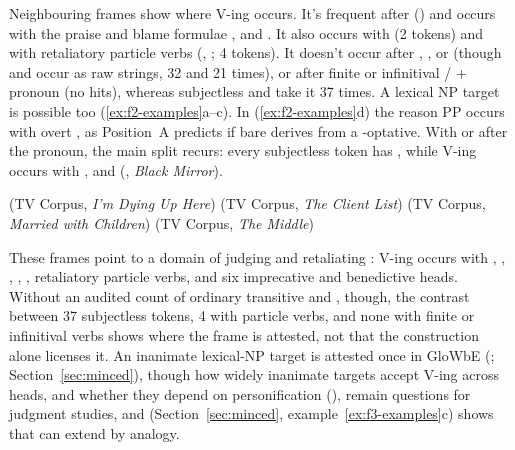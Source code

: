 \documentclass[12pt]{article}
\begin{document}
Neighbouring frames show where  V-ing occurs. It's frequent after  () and occurs with the praise and blame formulae ,  and . It also occurs with  (2 tokens) and with retaliatory particle verbs (, ; 4 tokens). It doesn't occur after , ,  or  (though  and  occur as raw strings, 32 and 21 times), or after finite or infinitival / + pronoun (no hits), whereas subjectless  and  take it 37 times. A lexical NP target is possible too (\ref{ex:f2-examples}a--c). In (\ref{ex:f2-examples}d) the reason PP occurs with overt , as Position~A predicts if bare  derives from a -optative. With  or  after the pronoun, the main split recurs: every subjectless  token has , while  V-ing occurs with ,  and  (, \emph{Black Mirror}).

\ea\label{ex:f2-examples}
\ea {} \hfill (TV Corpus, \emph{I'm Dying Up Here})
\ex {} \hfill (TV Corpus, \emph{The Client List})
\ex {} \hfill (TV Corpus, \emph{Married with Children})
\ex {} \hfill (TV Corpus, \emph{The Middle})
\z
\z

These frames point to a domain of judging and retaliating \citep{fillmore1971}:  V-ing occurs with , , , , , retaliatory particle verbs, and six imprecative and benedictive heads. Without an audited count of ordinary transitive  and , though, the contrast between 37 subjectless tokens, 4 with particle verbs, and none with finite or infinitival verbs shows where the frame is attested, not that the construction alone licenses it. An inanimate lexical-NP target is attested once in GloWbE (; Section~\ref{sec:minced}), though how widely inanimate targets accept  V-ing across heads, and whether they depend on personification (), remain questions for judgment studies, and  (Section~\ref{sec:minced}, example~\ref{ex:f3-examples}c) shows that  can extend by analogy.
\end{document}
